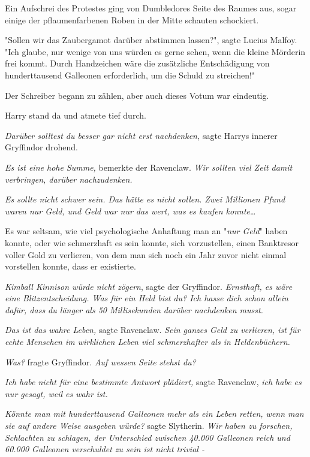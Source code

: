 {Ein Aufschrei des Protestes ging von Dumbledores Seite des Raumes aus, sogar einige der pflaumenfarbenen Roben in der Mitte schauten schockiert.

"Sollen wir das Zaubergamot darüber abstimmen lassen?", sagte Lucius Malfoy. "Ich glaube, nur wenige von uns würden es gerne sehen, wenn die kleine Mörderin frei kommt. Durch Handzeichen wäre die zusätzliche Entschädigung von hunderttausend Galleonen erforderlich, um die Schuld zu streichen!"

Der Schreiber begann zu zählen, aber auch dieses Votum war eindeutig.

Harry stand da und atmete tief durch.

\emph{Darüber solltest du besser gar nicht erst nachdenken,} sagte Harrys innerer Gryffindor drohend.

\emph{Es ist eine hohe Summe,} bemerkte der Ravenclaw. \emph{Wir sollten viel Zeit damit verbringen, darüber nachzudenken.}

\emph{Es sollte nicht schwer sein. Das hätte es nicht sollen. Zwei Millionen Pfund waren nur Geld, und Geld war nur das wert, was es kaufen konnte}…

Es war seltsam, wie viel psychologische Anhaftung man an "\emph{nur Geld}" haben konnte, oder wie schmerzhaft es sein konnte, sich vorzustellen, einen Banktresor voller Gold zu verlieren, von dem man sich noch ein Jahr zuvor nicht einmal vorstellen konnte, dass er existierte.

\emph{Kimball Kinnison würde nicht zögern}, sagte der Gryffindor. \emph{Ernsthaft, es wäre eine Blitzentscheidung. Was für ein Held bist du? Ich hasse dich schon allein dafür, dass du länger als 50 Millisekunden darüber nachdenken musst.}

\emph{Das ist das wahre Leben,} sagte Ravenclaw. \emph{Sein ganzes Geld zu verlieren, ist für echte Menschen im wirklichen Leben viel schmerzhafter als in Heldenbüchern.}

\emph{Was?} fragte Gryffindor. \emph{Auf wessen Seite stehst du?}

\emph{Ich habe nicht für eine bestimmte Antwort plädiert,} sagte Ravenclaw, \emph{ich habe es nur gesagt, weil es wahr ist.}

\emph{Könnte man mit hunderttausend Galleonen mehr als ein Leben retten, wenn man sie auf andere Weise ausgeben würde?} sagte Slytherin. \emph{Wir haben zu forschen, Schlachten zu schlagen, der Unterschied zwischen 40.000 Galleonen reich und 60.000 Galleonen verschuldet zu sein ist nicht trivial -}

}
